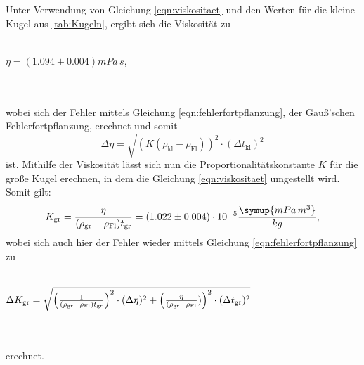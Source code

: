 Unter Verwendung von Gleichung \eqref{eqn:viskositaet} und den Werten für die kleine Kugel aus \autoref{tab:Kugeln}, ergibt sich die Viskosität zu
\\ \\
\centerline{$\eta = (1.094 \pm 0.004)  mPa \, s$,}
\\ \\
wobei sich der Fehler mittels Gleichung \eqref{eqn:fehlerfortpflanzung}, der Gauß'schen Fehlerfortpflanzung, erechnet und somit
\begin{equation}
\Delta \eta = \sqrt{(K(\rho_\text{kl} - \rho_\text{Fl}))^2 \cdot (\Delta t_\text{kl})^2}
\end{equation}
ist.
Mithilfe der Viskosität lässt sich nun die Proportionalitätskonstante $K$ für die große Kugel erechnen, in dem die Gleichung \eqref{eqn:viskositaet}
umgestellt wird.
Somit gilt:
\begin{equation}
K_\text{gr} = \frac{\eta}{(\rho_\text{gr} - \rho_\text{Fl})t_\text{gr}} = (1.022 \pm 0.004) \cdot 10^{-5} \frac{\symup{mPa \, m^3}}{kg},
\end{equation}
wobei sich auch hier der Fehler wieder mittels Gleichung \eqref{eqn:fehlerfortpflanzung} zu 
\\ \\
\centerline{$\Delta K_\text{gr} = \sqrt{\Bigl(\frac{1}{(\rho_\text{gr} - \rho_\text{Fl})t_\text{gr}}\Bigr)^2 \cdot (\Delta \eta)^2 + \Bigl( \frac{\eta}{(\rho_\text{gr} - \rho_\text{Fl}})\Bigr)^2 \cdot (\Delta t_\text{gr})^2 }  $}
\\ \\
erechnet.



